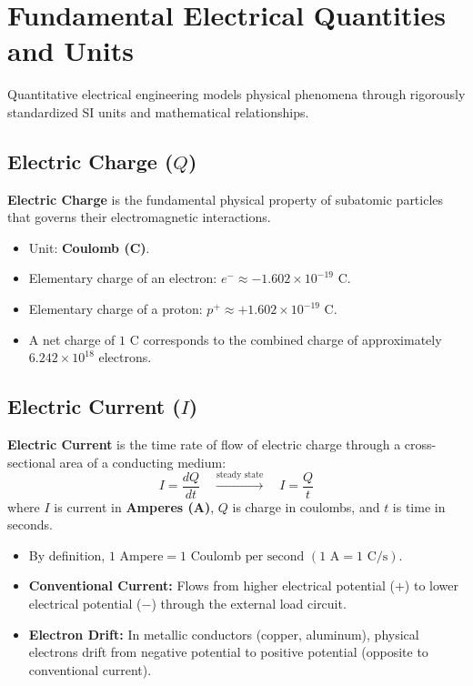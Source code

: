 \section{Fundamental Electrical Quantities and Units}
\label{sec:electrical_quantities}

Quantitative electrical engineering models physical phenomena through rigorously standardized SI units and mathematical relationships.

\subsection{Electric Charge ($Q$)}
\textbf{Electric Charge} is the fundamental physical property of subatomic particles that governs their electromagnetic interactions.
\begin{itemize}
    \item Unit: \textbf{Coulomb (C)}.
    \item Elementary charge of an electron: $e^- \approx -1.602 \times 10^{-19}\text{ C}$.
    \item Elementary charge of a proton: $p^+ \approx +1.602 \times 10^{-19}\text{ C}$.
    \item A net charge of $1\text{ C}$ corresponds to the combined charge of approximately $6.242 \times 10^{18}$ electrons.
\end{itemize}

\subsection{Electric Current ($I$)}
\textbf{Electric Current} is the time rate of flow of electric charge through a cross-sectional area of a conducting medium:
\begin{equation}
\label{eq:current_def}
\boxed{I = \frac{dQ}{dt} \quad \xrightarrow{\text{steady state}} \quad I = \frac{Q}{t}}
\end{equation}
where $I$ is current in \textbf{Amperes (A)}, $Q$ is charge in coulombs, and $t$ is time in seconds.
\begin{itemize}
    \item By definition, $1\text{ Ampere} = 1\text{ Coulomb per second } (1\text{ A} = 1\text{ C/s})$.
    \item \textbf{Conventional Current:} Flows from higher electrical potential ($+$) to lower electrical potential ($-$) through the external load circuit.
    \item \textbf{Electron Drift:} In metallic conductors (copper, aluminum), physical electrons drift from negative potential to positive potential (opposite to conventional current).
\end{itemize}

